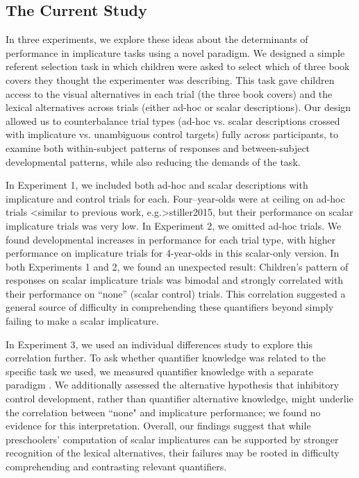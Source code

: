 \documentclass[man]{apa2}
\begin{document}

\subsection{The Current Study}

In three experiments, we explore these ideas about the determinants of performance in implicature tasks using a novel paradigm. We designed a simple referent selection task in which children were asked to select which of three book covers they thought the experimenter was describing. This task gave children access to the visual alternatives in each trial (the three book covers) and the lexical alternatives across trials (either ad-hoc or scalar descriptions). Our design allowed us to  counterbalance trial types (ad-hoc vs. scalar descriptions crossed with implicature vs. unambiguous control targets) fully across participants, to examine both within-subject patterns of responses and between-subject developmental patterns, while also reducing the demands of the task.

In Experiment 1, we included both ad-hoc and scalar descriptions with implicature and control trials for each. Four--year-olds were at ceiling on ad-hoc trials \citeA<similar to previous work, e.g.>{stiller2015}, but their performance on scalar implicature trials was very low. In Experiment 2, we omitted ad-hoc trials. We found developmental increases in performance for each trial type, with higher performance on implicature trials for 4-year-olds in this scalar-only version. In both Experiments 1 and 2, we found an unexpected result: Children's pattern of responses on scalar implicature trials was bimodal and strongly correlated with their performance on ``none'' (scalar control) trials. This correlation suggested a general source of difficulty in comprehending these quantifiers beyond simply failing to make a scalar implicature.

In Experiment 3, we used an individual differences study to explore this correlation further. To ask whether quantifier knowledge was related to the specific task we used, we measured quantifier knowledge with a separate paradigm . We additionally assessed the alternative hypothesis that inhibitory control development, rather than quantifier alternative knowledge, might underlie the correlation between ``none" and implicature performance; we found no evidence for this interpretation.  Overall, our findings suggest that while preschoolers' computation of scalar implicatures can be supported by stronger recognition of the lexical alternatives, their failures may be rooted in difficulty comprehending and contrasting relevant quantifiers.
\end{document}
